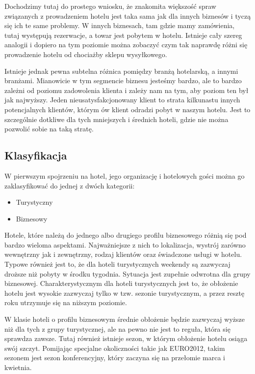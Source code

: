 \documentclass[a4paper,onecolumn,oneside,11pt,wide,floatssmall]{mwrep}
\theoremstyle{definition}
\theoremstyle{plain}%
\theoremstyle{remark}
\begin{document}
  Dochodzimy tutaj do prostego wniosku, że znakomita
 większość spraw związanych z prowadzeniem hotelu jest taka sama jak dla innych
 biznesów i tyczą się ich te same problemy. W innych biznesach, tam gdzie mamy
 zamówienia, tutaj występują rezerwacje, a towar jest pobytem w hotelu. Istnieje
 cały szereg analogii i dopiero na tym poziomie można zobaczyć czym tak naprawdę
 różni się prowadzenie hotelu od chociażby sklepu wysyłkowego.
 
 Istnieje jednak pewna subtelna różnica pomiędzy branżą hotelarską, a innymi
 branżami. Mianowicie w tym segmencie biznesu jesteśmy bardzo, ale to bardzo
 zależni od poziomu zadowolenia klienta i zależy nam na tym, aby poziom ten był
 jak najwyższy. Jeden nieusatysfakcjonowany klient to strata kilkunastu
 innych potencjalnych klientów, którym ów klient odradzi pobyt w naszym hotelu.
 Jest to szczególnie dotkliwe dla tych mniejszych i średnich hoteli, gdzie nie
 można pozwolić sobie na taką stratę.

\subsection{Klasyfikacja}
W pierwszym spojrzeniu na hotel, jego organizację i hotelowych gości można go
zaklasyfikować do jednej z dwóch kategorii:
\begin{itemize}
  \item Turystyczny
  \item Biznesowy 
\end{itemize}

Hotele, które należą do jednego albo drugiego profilu biznesowego różnią się pod
bardzo wieloma aspektami. Najważniejsze z nich to lokalizacja, wystrój
zarówno wewnętrzny jak i zewnętrzny, rodzaj klientów oraz świadczone usługi
w hotelu. Typowe również jest to, że dla hoteli turystycznych weekendy są zazwyczaj
 droższe niż pobyty w środku tygodnia. Sytuacja jest zupełnie odwrotna dla grupy
 biznesowej. Charakterystycznym dla hoteli turystycznych jest to, że obłożenie
 hotelu jest wysokie zazwyczaj tylko w tzw. sezonie turystycznym, a przez resztę
 roku utrzymuje się na niższym poziomie.
 
 W klasie hoteli o profilu biznesowym średnie obłożenie będzie zazwyczaj wyższe
 niż dla tych z grupy turystycznej, ale na pewno nie jest to reguła, która się
  sprawdza zawsze. Tutaj również istnieje sezon, w którym obłożenie hotelu
  osiąga swój szczyt. Pomijając specjalne okoliczności takie jak EURO2012, takim
  sezonem jest sezon konferencyjny, który zaczyna się na przełomie marca i kwietnia.
  
\end{document}
